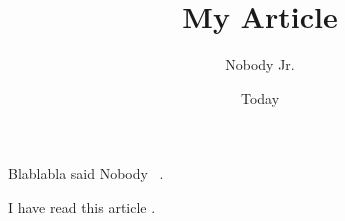 \documentclass[11pt]{article}
\begin{document}
\title{My Article}
\author{Nobody Jr.}
\date{Today}
\maketitle

Blablabla said Nobody ~\cite{Nobody06}.

I have read this article \cite{owlref}.
{}

\end{document}
